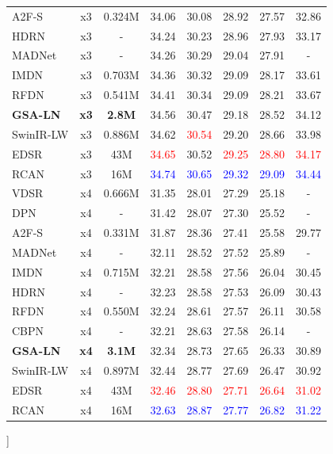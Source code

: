 \documentclass[conference]{IEEEtran}
\newcommand{\rankfirst}[1]{\textcolor{blue}{#1}}
\newcommand{\ranksecond}[1]{\textcolor{red}{#1}}
\begin{document}
\begin{@twocolumnfalse}
\begin{tabular*}{\textwidth}{@{\extracolsep{\fill}}lccccccc}
A2F-S & x3 & 0.324M & 34.06 & 30.08 & 28.92 & 27.57 & 32.86 \\
HDRN & x3 & - & 34.24 & 30.23 & 28.96 & 27.93 & 33.17 \\
MADNet & x3 & - & 34.26 & 30.29 & 29.04 & 27.91 & - \\
IMDN & x3 & 0.703M & 34.36 & 30.32 & 29.09 & 28.17 & 33.61 \\
RFDN & x3 & 0.541M & 34.41 & 30.34 & 29.09 & 28.21 & 33.67 \\
\textbf{GSA-LN} & \textbf{x3} & \textbf{2.8M} & 34.56 & 30.47 & 29.18 & 28.52 & 34.12 \\
SwinIR-LW & x3 & 0.886M & 34.62 & \ranksecond{30.54} & 29.20 & 28.66 & 33.98 \\
EDSR & x3 & 43M & \ranksecond{34.65} & 30.52 & \ranksecond{29.25} & \ranksecond{28.80} & \ranksecond{34.17} \\
RCAN & x3 & 16M & \rankfirst{34.74} & \rankfirst{30.65} & \rankfirst{29.32} & \rankfirst{29.09} & \rankfirst{34.44} \\
\midrule
VDSR & x4 & 0.666M & 31.35 & 28.01 & 27.29 & 25.18 & - \\
DPN & x4 & - & 31.42 & 28.07 & 27.30 & 25.52 & - \\
A2F-S & x4 & 0.331M & 31.87 & 28.36 & 27.41 & 25.58 & 29.77 \\
MADNet & x4 & - & 32.11 & 28.52 & 27.52 & 25.89 & - \\
IMDN & x4 & 0.715M & 32.21 & 28.58 & 27.56 & 26.04 & 30.45 \\
HDRN & x4 & - & 32.23 & 28.58 & 27.53 & 26.09 & 30.43 \\
RFDN & x4 & 0.550M & 32.24 & 28.61 & 27.57 & 26.11 & 30.58 \\
CBPN & x4 & - & 32.21 & 28.63 & 27.58 & 26.14 & - \\
\textbf{GSA-LN} & \textbf{x4} & \textbf{3.1M} & 32.34 & 28.73 & 27.65 & 26.33 & 30.89 \\
SwinIR-LW & x4 & 0.897M & 32.44 & 28.77 & 27.69 & 26.47 & 30.92 \\
EDSR & x4 & 43M & \ranksecond{32.46} & \ranksecond{28.80} & \ranksecond{27.71} & \ranksecond{26.64} & \ranksecond{31.02} \\
RCAN & x4 & 16M & \rankfirst{32.63} & \rankfirst{28.87} & \rankfirst{27.77} & \rankfirst{26.82} & \rankfirst{31.22} \\
\bottomrule
\end{tabular*}
\vspace{0.8\baselineskip}
\end{@twocolumnfalse}
]
\end{document}
